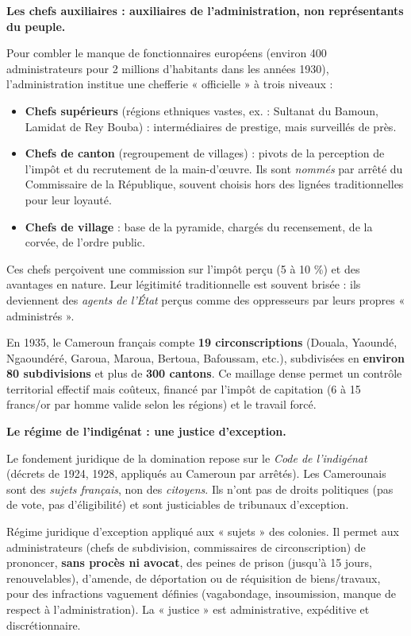 \documentclass[11pt]{article}
\begin{document}
\textbf{Les chefs auxiliaires : auxiliaires de l'administration, non représentants du peuple.}\par
Pour combler le manque de fonctionnaires européens (environ 400 administrateurs pour 2 millions d'habitants dans les années 1930), l'administration institue une chefferie « officielle » à trois niveaux :
\begin{itemize}
    \item \textbf{Chefs supérieurs} (régions ethniques vastes, ex. : Sultanat du Bamoun, Lamidat de Rey Bouba) : intermédiaires de prestige, mais surveillés de près.
    \item \textbf{Chefs de canton} (regroupement de villages) : pivots de la perception de l'impôt et du recrutement de la main-d'œuvre. Ils sont \emph{nommés} par arrêté du Commissaire de la République, souvent choisis hors des lignées traditionnelles pour leur loyauté.
    \item \textbf{Chefs de village} : base de la pyramide, chargés du recensement, de la corvée, de l'ordre public.
\end{itemize}
Ces chefs perçoivent une commission sur l'impôt perçu (5 à 10 \%) et des avantages en nature. Leur légitimité traditionnelle est souvent brisée : ils deviennent des \emph{agents de l'État} perçus comme des oppresseurs par leurs propres « administrés ».

\begin{exemplebox}
En 1935, le Cameroun français compte \textbf{19 circonscriptions} (Douala, Yaoundé, Ngaoundéré, Garoua, Maroua, Bertoua, Bafoussam, etc.), subdivisées en \textbf{environ 80 subdivisions} et plus de \textbf{300 cantons}. Ce maillage dense permet un contrôle territorial effectif mais coûteux, financé par l'impôt de capitation (6 à 15 francs/or par homme valide selon les régions) et le travail forcé.
\end{exemplebox}

\textbf{Le régime de l'indigénat : une justice d'exception.}\par
Le fondement juridique de la domination repose sur le \emph{Code de l'indigénat} (décrets de 1924, 1928, appliqués au Cameroun par arrêtés). Les Camerounais sont des \emph{sujets français}, non des \emph{citoyens}. Ils n'ont pas de droits politiques (pas de vote, pas d'éligibilité) et sont justiciables de tribunaux d'exception.

\begin{definition}
Régime juridique d'exception appliqué aux « sujets » des colonies. Il permet aux administrateurs (chefs de subdivision, commissaires de circonscription) de prononcer, \textbf{sans procès ni avocat}, des peines de prison (jusqu'à 15 jours, renouvelables), d'amende, de déportation ou de réquisition de biens/travaux, pour des infractions vaguement définies (vagabondage, insoumission, manque de respect à l'administration). La « justice » est administrative, expéditive et discrétionnaire.
\end{definition}
\end{document}
